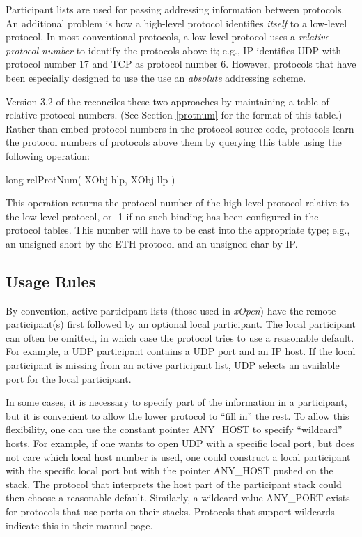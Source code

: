 Participant lists are used for passing addressing information between
protocols. An additional problem is how a high-level protocol
identifies {\em itself} to a low-level protocol.  In most conventional
protocols, a low-level protocol uses a {\em relative protocol number}
to identify the protocols above it; e.g., IP identifies UDP with
protocol number 17 and TCP as protocol number 6. However, protocols
that have been especially designed to use the \xk{} use an
{\em absolute} addressing scheme.

Version 3.2 of the \xk{} reconciles these two approaches by
maintaining a table of relative protocol numbers.  (See Section
\ref{protnum} for the format of this table.)  Rather than embed
protocol numbers in the protocol source code, protocols learn the
protocol numbers of protocols above them by querying this table using
the following operation:
\medskip

{\sem long}	{\bold relProtNum}( {\sem XObj} {\caps hlp}, {\sem XObj} {\caps llp} )
\medskip

\noindent This operation returns the protocol number of the high-level
protocol relative to the low-level protocol, or -1 if no such binding
has been configured in the protocol tables.  This number will have to
be cast into the appropriate type; e.g., an unsigned short by the
ETH protocol and an unsigned char by IP.

\subsection{Usage Rules}
\label{part_usage}

By convention, active participant lists (those used in {\em xOpen})
have the remote participant(s)
first followed by an optional local participant.  The local
participant can often be omitted, in which case the protocol tries to
use a reasonable default.  For example, a UDP participant contains a
UDP port and an IP host.  If the local participant is missing from an
active participant list, UDP selects an available port for the local
participant.

In some cases, it is necessary to specify part of the information in a
participant, but it is convenient to allow the lower protocol to
``fill in'' the rest.  To allow this flexibility, one can use the
constant pointer ANY\_HOST to specify ``wildcard'' hosts.  For
example, if one wants to open UDP with a specific local port, but does
not care which local host number is used, one could construct a local
participant with the specific local port but with the pointer
ANY\_HOST pushed on the stack.  The protocol that interprets the host
part of the participant stack could then choose a reasonable default.
Similarly, a wildcard value ANY\_PORT exists for protocols that use ports
on their stacks.  Protocols that support wildcards indicate this
in their manual page.


